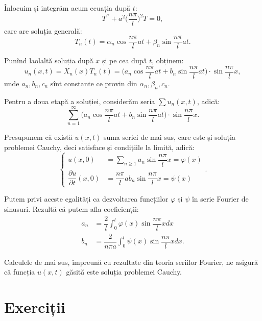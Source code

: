 Înlocuim și integrăm acum ecuația după $ t $:
\[
  T^{\prime\prime} + a^2\Big( \dfrac{n\pi}{l} \Big)^2 T = 0,
\]
care are soluția generală:
\[
  T_n(t) = \alpha_n \cos \dfrac{n\pi}{l} at + \beta_n\sin \dfrac{n\pi}{l} at.
\]

Punînd laolaltă soluția după $ x $ și pe cea după $ t $, obținem:
\begin{equation} \label{eq:coarda-particulara}
  u_n(x, t) = X_n(x) T_n(t) = \Big( a_n \cos \dfrac{n\pi}{l} at + %
  b_n \sin \dfrac{n\pi}{l} at \Big) \cdot \sin \dfrac{n\pi}{l} x,
\end{equation}
unde $ a_n, b_n, c_n $ sînt constante ce provin din $ \alpha_n, \beta_n, c_n $.

Pentru a doua etapă a soluției, considerăm seria $ \sum u_n(x, t) $, adică:
\[
  \sum_{n = 1}^\infty \Big(a_n\cos\dfrac{n\pi}{l} at + %
  b_n \sin \dfrac{n\pi}{l} at\Big) \cdot \sin \dfrac{n \pi}{l} x.
\]

Presupunem că există $ u(x, t) $ suma seriei de mai sus, care este și soluția
problemei Cauchy, deci satisface și condițiile la limită, adică:
\[
  \begin{cases}
    u(x, 0) &= \sum_{n\geq 1} a_n \sin \dfrac{n\pi}{l} x = \varphi(x) \\
    \dfrac{\partial u}{\partial t}(x, 0) &= \dfrac{n\pi}{l}ab_n\sin\dfrac{n\pi}{l}x = \psi(x)
  \end{cases}.
\]

Putem privi aceste egalități ca dezvoltarea funcțiilor $ \varphi $ și $ \psi $ în serie
Fourier de sinusuri. Rezultă că putem afla coeficienții:
\begin{eqnarray} \label{eq:fourier}
  a_n &= \dfrac{2}{l} \int_0^l \varphi(x) \sin \dfrac{n\pi}{l} xdx \\
  b_n &= \dfrac{2}{n\pi a} \int_0^l \psi(x) \sin \dfrac{n \pi}{l} xdx.
\end{eqnarray}

\begin{remark}\label{rk:coarda-finita-fourier}
  Calculele de mai sus, împreună cu rezultate din teoria seriilor Fourier, ne asigură
  că funcția $ u(x, t) $ găsită este soluția problemei Cauchy.
\end{remark}


\section{Exerciții}

